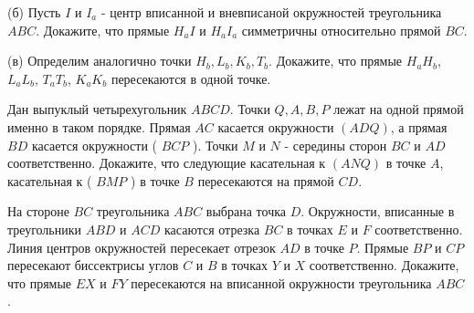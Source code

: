 (б) Пусть $I$ и $I_a$ - центр вписанной и вневписаной окружностей треугольника $A B C$. Докажите, что прямые $H_a I$ и $H_a I_a$ симметричны относительно прямой $B C$.

(в) Определим аналогично точки $H_b, L_b, K_b, T_b$. Докажите, что прямые $H_a H_b$, $L_a L_b$, $T_a T_b$, $K_a K_b$ пересекаются в одной точке.

Дан выпуклый четырехугольник $A B C D$. Точки $Q, A, B, P$ лежат на одной прямой именно в таком порядке. Прямая $A C$ касается окружности $(A D Q)$, а прямая $B D$ касается окружности ( $B C P$ ). Точки $M$ и $N$ - середины сторон $B C$ и $A D$ соответственно. Докажите, что следующие касательная к $(A N Q)$ в точке $A$, касательная к ( $B M P$ ) в точке $B$ пересекаются на прямой $C D$.

На стороне $B C$ треугольника $A B C$ выбрана точка $D$. Окружности, вписанные в треугольники $A B D$ и $A C D$ касаются отрезка $B C$ в точках $E$ и $F$ соответственно. Линия центров окружностей пересекает отрезок $A D$ в точке $P$. Прямые $B P$ и $C P$ пересекают биссектрисы углов $C$ и $B$ в точках $Y$ и $X$ соответственно. Докажите, что прямые $E X$ и $F Y$ пересекаются на вписанной окружности треугольника $A B C$.